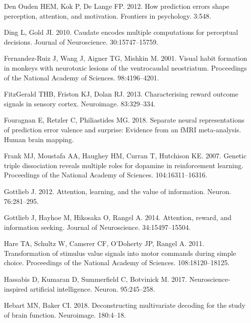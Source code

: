 \documentclass[]{article}
\begin{document}
\leavevmode\hypertarget{ref-Denoudenetal2012}{}%
Den Ouden HEM, Kok P, De Lange FP. 2012. How prediction errors shape
perception, attention, and motivation. Frontiers in psychology. 3:548.

\leavevmode\hypertarget{ref-DingGold2010}{}%
Ding L, Gold JI. 2010. Caudate encodes multiple computations for
perceptual decisions. Journal of Neuroscience. 30:15747--15759.

\leavevmode\hypertarget{ref-Fernandezetal2001}{}%
Fernandez-Ruiz J, Wang J, Aigner TG, Mishkin M. 2001. Visual habit
formation in monkeys with neurotoxic lesions of the ventrocaudal
neostriatum. Proceedings of the National Academy of Sciences.
98:4196--4201.

\leavevmode\hypertarget{ref-Fitzgeraldetal2013}{}%
FitzGerald THB, Friston KJ, Dolan RJ. 2013. Characterising reward
outcome signals in sensory cortex. Neuroimage. 83:329--334.

\leavevmode\hypertarget{ref-Fouragnanetal2018}{}%
Fouragnan E, Retzler C, Philiastides MG. 2018. Separate neural
representations of prediction error valence and surprise: Evidence from
an fMRI meta-analysis. Human brain mapping.

\leavevmode\hypertarget{ref-Franketal2007}{}%
Frank MJ, Moustafa AA, Haughey HM, Curran T, Hutchison KE. 2007. Genetic
triple dissociation reveals multiple roles for dopamine in reinforcement
learning. Proceedings of the National Academy of Sciences.
104:16311--16316.

\leavevmode\hypertarget{ref-Gottlieb2012}{}%
Gottlieb J. 2012. Attention, learning, and the value of information.
Neuron. 76:281--295.

\leavevmode\hypertarget{ref-Gottliebetal2014}{}%
Gottlieb J, Hayhoe M, Hikosaka O, Rangel A. 2014. Attention, reward, and
information seeking. Journal of Neuroscience. 34:15497--15504.

\leavevmode\hypertarget{ref-Hareetal2011}{}%
Hare TA, Schultz W, Camerer CF, O'Doherty JP, Rangel A. 2011.
Transformation of stimulus value signals into motor commands during
simple choice. Proceedings of the National Academy of Sciences.
108:18120--18125.

\leavevmode\hypertarget{ref-Hassabisetal2017}{}%
Hassabis D, Kumaran D, Summerfield C, Botvinick M. 2017.
Neuroscience-inspired artificial intelligence. Neuron. 95:245--258.

\leavevmode\hypertarget{ref-HebartBaker2018}{}%
Hebart MN, Baker CI. 2018. Deconstructing multivariate decoding for the
study of brain function. Neuroimage. 180:4--18.
\end{document}
